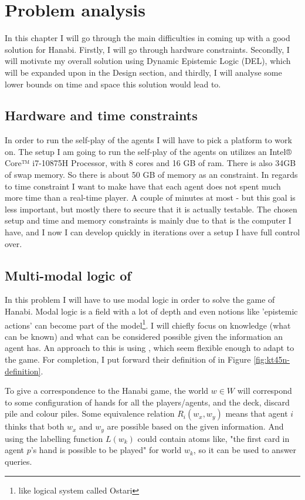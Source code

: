 \section{Problem analysis}

In this chapter I will go through the main difficulties in coming up with a good solution for Hanabi. 
Firstly, I will go through hardware constraints. 
Secondly, I will motivate my overall solution using Dynamic Epistemic Logic (DEL), which will be expanded upon in the Design section, and thirdly, I will analyse some lower bounds on time and space this solution would lead to.

\subsection{Hardware and time constraints}
In order to run the self-play of the agents I will have to pick a platform to work on.
The setup I am going to run the self-play of the agents on utilizes an Intel® Core™ i7-10875H Processor, with 8 cores and 16 GB of ram. 
There is also 34GB of swap memory. 
So there is about 50 GB of memory as an constraint.
In regards to time constraint I want to make have that each agent does not spent much more time than a real-time player. 
A couple of minutes at most - but this goal is less important, but mostly there to secure that it is actually testable.
The chosen setup and time and memory constraints is mainly due to that is the computer I have, and I now I can develop quickly in iterations over a setup I have full control over.

\subsection{Multi-modal logic of \SfiveN{}} \label{sec:definition-ktfourfiven}
In this problem I will have to use modal logic in order to solve the game of Hanabi. 
Modal logic is a field with a lot of depth and even notions like 'epistemic actions' can become part of the model\footnote{like \cite{EgerAndMartens17} logical system called Ostari}. 
I will chiefly focus on knowledge (what can be known) and what can be considered possible given the information an agent has. 
An approach to this is using \SfiveN{} \cite{HuthAndRyan2004KT45n}, which seem flexible enough to adapt to the game. 
For completion, I put forward their definition of \SfiveN{} in Figure \ref{fig:kt45n-definition}. 

To give a correspondence to the Hanabi game, the world $w \in W$ will correspond to some configuration of hands for all the players/agents, and the deck, discard pile and colour piles. 
Some equivalence relation $R_i(w_x,w_y)$ means that agent $i$ thinks that both $w_x$ and $w_y$ are possible based on the given information. 
And using the labelling function $L(w_k)$ could contain atoms like, "the first card in agent $p$'s hand is possible to be played" for world $w_k$, so it can be used to answer queries. 

